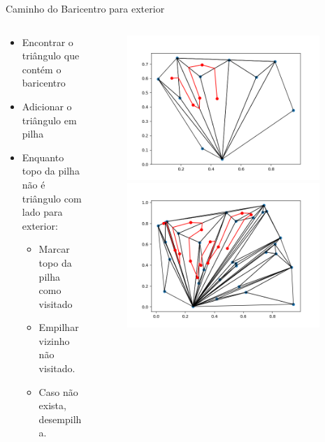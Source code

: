\documentclass[aspectratio=169,usenames,dvipsnames]{beamer}
\begin{document}
\begin{frame}{Caminho do Baricentro para exterior}

  \begin{columns}
    \begin{column}{0.5\textwidth}
      \begin{itemize}
        \item Encontrar o triângulo que contém o baricentro
        \item Adicionar o triângulo em pilha
        \item Enquanto topo da pilha não é triângulo com lado para exterior:
        \begin{itemize}
          \item Marcar topo da pilha como visitado
          \item Empilhar vizinho não visitado.
          \item Caso não exista, desempilha.
        \end{itemize}
      \end{itemize}
    \end{column}
    \begin{column}{0.5\textwidth}
      \begin{figure}
        \begin{overprint}
          \includegraphics[width=0.95\textwidth]{./figs/bom_exemplo_0_graham_path.png}
          \includegraphics[width=0.95\textwidth]{./figs/path.png}

\end{overprint}
\end{figure}
\end{column}
\end{columns}
\end{frame}
\end{document}

